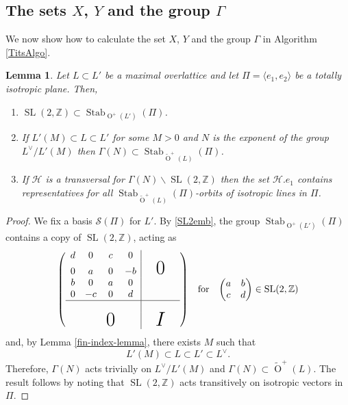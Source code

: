\documentclass[12pt, a4paper]{article}
\newtheorem{lemma}[theorem]{Lemma}
\newcommand{\ZZ}{\mathbb{Z}}
\newcommand{\la}{\langle}
\newcommand{\ra}{\rangle}
\newcommand{\beq}{\begin{equation*}}
\newcommand{\eeq}{\end{equation*}}
\newcommand{\hc}{\mathcal{H}}
\newcommand{\Sc}{\mathcal{S}}
\newcommand{\opn}{\operatorname}
\newcommand{\bpm}{\begin{pmatrix}}
\newcommand{\epm}{\end{pmatrix}}
\newcommand{\old}{\opn{O}^+(L')}
\newcommand{\otl}{\widetilde{\opn{O}}^+(L)}
\begin{document}
\subsection{The sets $X$, $Y$ and the group $\Gamma$}
We now show how to calculate the set $X$, $Y$ and the group $\Gamma$ in Algorithm \ref{TitsAlgo}.
\begin{lemma}\label{X-Gamma-Lemma}
  Let $L \subset L'$ be a maximal overlattice and let 
  $\Pi = \la e_1, e_2 \ra$ be a totally isotropic plane.
  Then,
  \begin{enumerate}
  \item $\opn{SL}(2, \ZZ) \subset \opn{Stab}_{\old}(\Pi)$.
  \item If $L'(M) \subset L \subset L'$ for some $M>0$ and  $N$ is the  exponent of the group $L^{\vee}/ L'(M)$  then $\Gamma(N) \subset \opn{Stab}_{\otl}(\Pi)$.
  \item If $\hc$ is a  transversal for $\Gamma(N) \backslash \opn{SL}(2, \ZZ)$ then the set $\hc .e_1$ contains  representatives for all $\opn{Stab}_{\otl}(\Pi)$-orbits of isotropic lines in $\Pi$.
  \end{enumerate}
\end{lemma}
\begin{proof}
  We fix a basis $\Sc(\Pi)$ for $L'$.
  By \eqref{SL2emb}, the group $\opn{Stab}_{\opn{O}^+(L')}(\Pi)$ contains a copy of $\opn{SL}(2, \ZZ)$, acting as
  \begin{align*}
      \left(
  \begin{array}{c c  c c | c c c }
    d & 0 & c & 0 & & & \\
    0 & a & 0 & - b & &\textbf{\huge{$0$}} &\\
    b & 0 & a & 0 & & & \\
    0 & -c & 0 & d & & &\\
    \hline
    & &    &     &   & & \\
    & &  \textbf{\huge{$0$}}  &     & &  \textbf{\huge{$I$}}  &
  \end{array}
  \right) && \text{for} &&
  \bpm a & b \\ c & d \epm \in \opn{SL}(2, \ZZ)
  \end{align*}
and, by Lemma \ref{fin-index-lemma}, there exists $M$ such that
  \beq
  L'(M) \subset L \subset L' \subset L^{\vee}.
  \eeq
  Therefore, $\Gamma(N)$ acts trivially on $L^{\vee}/L'(M)$ and  $ \Gamma(N) \subset \otl$.
  The result follows by noting that $\opn{SL}(2, \ZZ)$ acts transitively on isotropic vectors in $\Pi$.  
\end{proof}
\end{document}
